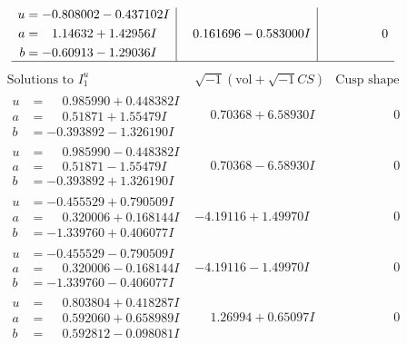 \documentclass[1p]{elsarticle_modified}
\theoremstyle{definition}
\newcommand{\I}{\sqrt{-1}}
\begin{document}
$$\begin{array}{c|c|c}
\begin{aligned}
u &= -0.808002 - 0.437102 I \\
a &= \phantom{-}1.14632 + 1.42956 I \\
b &= -0.60913 - 1.29036 I\end{aligned}
 & \phantom{-}0.161696 - 0.583000 I & \phantom{-0.000000 } 0\\
 \hline 
 \end{array}$$\newpage$$\begin{array}{c|c|c}  
\text{Solutions to }I^u_{1}& \I (\text{vol} + \sqrt{-1}CS) & \text{Cusp shape}\\
 \hline 
\begin{aligned}
u &= \phantom{-}0.985990 + 0.448382 I \\
a &= \phantom{-}0.51871 + 1.55479 I \\
b &= -0.393892 - 1.326190 I\end{aligned}
 & \phantom{-}0.70368 + 6.58930 I & \phantom{-0.000000 } 0 \\ \hline\begin{aligned}
u &= \phantom{-}0.985990 - 0.448382 I \\
a &= \phantom{-}0.51871 - 1.55479 I \\
b &= -0.393892 + 1.326190 I\end{aligned}
 & \phantom{-}0.70368 - 6.58930 I & \phantom{-0.000000 } 0 \\ \hline\begin{aligned}
u &= -0.455529 + 0.790509 I \\
a &= \phantom{-}0.320006 + 0.168144 I \\
b &= -1.339760 + 0.406077 I\end{aligned}
 & -4.19116 + 1.49970 I & \phantom{-0.000000 } 0 \\ \hline\begin{aligned}
u &= -0.455529 - 0.790509 I \\
a &= \phantom{-}0.320006 - 0.168144 I \\
b &= -1.339760 - 0.406077 I\end{aligned}
 & -4.19116 - 1.49970 I & \phantom{-0.000000 } 0 \\ \hline\begin{aligned}
u &= \phantom{-}0.803804 + 0.418287 I \\
a &= \phantom{-}0.592060 + 0.658989 I \\
b &= \phantom{-}0.592812 - 0.098081 I\end{aligned}
 & \phantom{-}1.26994 + 0.65097 I & \phantom{-0.000000 } 0 \\ \hline\begin{aligned}

\end{aligned}
\end{array}$$
\end{document}
